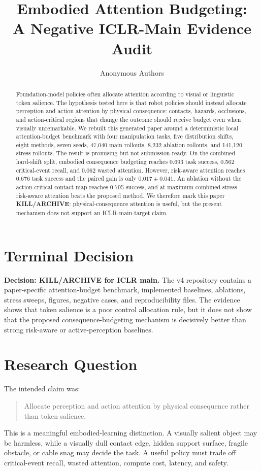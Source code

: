 \documentclass{article}
\title{Embodied Attention Budgeting:\\A Negative ICLR-Main Evidence Audit}
\author{Anonymous Authors}
\begin{document}
\maketitle

\begin{abstract}
Foundation-model policies often allocate attention according to visual or linguistic token salience. The hypothesis tested here is that robot policies should instead allocate perception and action attention by physical consequence: contacts, hazards, occlusions, and action-critical regions that change the outcome should receive budget even when visually unremarkable. We rebuilt this generated paper around a deterministic local attention-budget benchmark with four manipulation tasks, five distribution shifts, eight methods, seven seeds, 47,040 main rollouts, 8,232 ablation rollouts, and 141,120 stress rollouts. The result is promising but not submission-ready. On the combined hard-shift split, embodied consequence budgeting reaches 0.693 task success, 0.562 critical-event recall, and 0.062 wasted attention. However, risk-aware attention reaches 0.676 task success and the paired gain is only $0.017 \pm 0.041$. An ablation without the action-critical contact map reaches 0.705 success, and at maximum combined stress risk-aware attention beats the proposed method. We therefore mark this paper \textbf{KILL/ARCHIVE}: physical-consequence attention is useful, but the present mechanism does not support an ICLR-main-target claim.
\end{abstract}

\section{Terminal Decision}
\textbf{Decision: KILL/ARCHIVE for ICLR main.} The v4 repository contains a paper-specific attention-budget benchmark, implemented baselines, ablations, stress sweeps, figures, negative cases, and reproducibility files. The evidence shows that token salience is a poor control allocation rule, but it does not show that the proposed consequence-budgeting mechanism is decisively better than strong risk-aware or active-perception baselines.

\section{Research Question}
The intended claim was:
\begin{quote}
Allocate perception and action attention by physical consequence rather than token salience.
\end{quote}
This is a meaningful embodied-learning distinction. A visually salient object may be harmless, while a visually dull contact edge, hidden support surface, fragile obstacle, or cable snag may decide the task. A useful policy must trade off critical-event recall, wasted attention, compute cost, latency, and safety.
\end{document}

